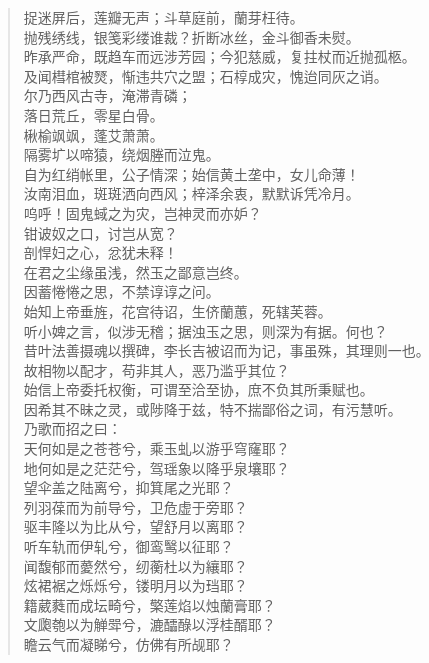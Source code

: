 \documentclass[12pt,oneside]{book}
\newenvironment{shici}{%
\begin{verse}%
\centering\large\hspace{12pt}}%
{\end{verse}}
\begin{document}
\begin{shici}
捉迷屏后，莲瓣无声；斗草庭前，蘭芽枉待。\\
抛残绣线，银笺彩缕谁裁？折断冰丝，金斗御香未熨。\\
昨承严命，既趋车而远涉芳园；今犯慈威，复拄杖而近抛孤柩。\\
及闻槥棺被燹，惭违共穴之盟；石椁成灾，愧迨同灰之诮。\\
尔乃西风古寺，淹滞青磷；\\
落日荒丘，零星白骨。\\
楸榆飒飒，蓬艾萧萧。\\
隔雾圹以啼猿，绕烟塍而泣鬼。\\
自为红绡帐里，公子情深；始信黄土垄中，女儿命薄！\\
汝南泪血，斑斑洒向西风；梓泽余衷，默默诉凭冷月。\\
呜呼！固鬼蜮之为灾，岂神灵而亦妒？\\
钳诐奴之口，讨岂从宽？\\
剖悍妇之心，忿犹未释！\\
在君之尘缘虽浅，然玉之鄙意岂终。\\
因蓄惓惓之思，不禁谆谆之问。\\
始知上帝垂旌，花宫待诏，生侪蘭蕙，死辖芙蓉。\\
听小婢之言，似涉无稽；据浊玉之思，则深为有据。何也？\\
昔叶法善摄魂以撰碑，李长吉被诏而为记，事虽殊，其理则一也。\\
故相物以配才，苟非其人，恶乃滥乎其位？\\
始信上帝委托权衡，可谓至洽至协，庶不负其所秉赋也。\\
因希其不昧之灵，或陟降于兹，特不揣鄙俗之词，有污慧听。\\
乃歌而招之曰：\\
天何如是之苍苍兮，乘玉虬以游乎穹窿耶？\\
地何如是之茫茫兮，驾瑶象以降乎泉壤耶？\\
望伞盖之陆离兮，抑箕尾之光耶？\\
列羽葆而为前导兮，卫危虚于旁耶？\\
驱丰隆以为比从兮，望舒月以离耶？\\
听车轨而伊轧兮，御鸾鹥以征耶？\\
闻馥郁而薆然兮，纫蘅杜以为纕耶？\\
炫裙裾之烁烁兮，镂明月以为珰耶？\\
籍葳蕤而成坛畸兮，檠莲焰以烛蘭膏耶？\\
文瓟匏以为觯斝兮，漉醽醁以浮桂醑耶？\\
瞻云气而凝睇兮，仿佛有所觇耶？\\

\end{shici}
\end{document}
